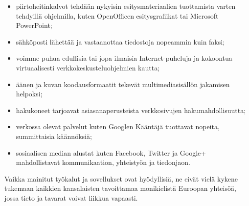 \documentclass[]{../../metanetpaper}
\begin{document}
\begin{Parallel}[c]{77mm}{77mm}
{\begin{itemize}
\item piirtoheitinkalvot tehdään nykyisin esitysmateriaalien
tuottamista varten tehdyillä ohjelmilla, kuten
\foreignlanguage{english}{OpenOfficen} esitysgrafiikat tai Microsoft
PowerPoint;

\item sähköposti lähettää ja vastaanottaa tiedostoja nopeammin kuin faksi;

\item voimme puhua edullisia tai jopa ilmaisia Internet-puheluja ja kokoontua
virtuaalisesti verkkokeskusteluohjelmien kautta;

\item äänen ja kuvan koodausformaatit tekevät multimediasisällön jakamisen helpoksi;

\item hakukoneet tarjoavat asiasanaperusteista verkkosivujen hakumahdollisuutta;

\item verkossa olevat palvelut kuten Googlen Kääntäjä tuottavat nopeita, summittaisia
käännöksiä;

\item sosiaalisen median alustat kuten Facebook, Twitter ja Google+ mahdollistavat
kommunikaation, yhteistyön ja tiedonjaon.
\end{itemize}
Vaikka mainitut työkalut ja sovellukset ovat hyödyllisiä, ne eivät vielä kykene
tukemaan kaikkien kansalaisten tavoittamaa monikielistä Euroopan yhteisöä,
jossa tieto ja tavarat voivat liikkua vapaasti.
}

\end{Parallel}
\end{document}
